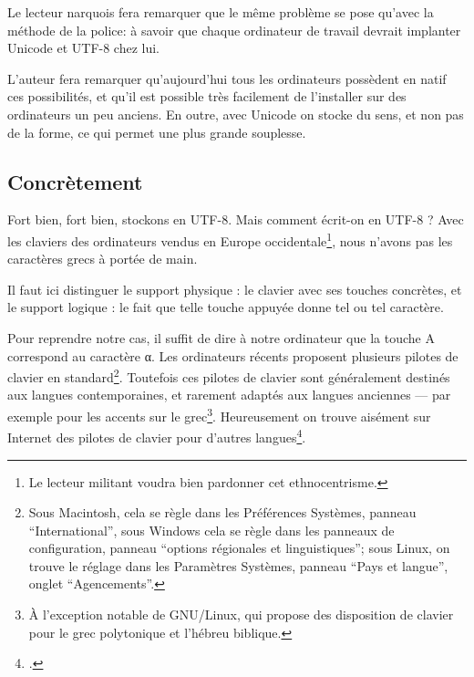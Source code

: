 \begin{plusloins}Le lecteur narquois fera remarquer que le même problème  se pose qu'avec la méthode de la police: à savoir que chaque ordinateur de travail devrait implanter Unicode et UTF-8 chez lui. 

L'auteur fera remarquer qu'aujourd'hui tous les ordinateurs possèdent en natif ces possibilités, et qu'il est possible très facilement de l'installer sur des ordinateurs un peu anciens. En outre, avec Unicode on stocke du sens, et non pas de la forme, ce qui permet une plus grande souplesse. 

\end{plusloins}

\subsection{Concrètement}

Fort bien, fort bien, stockons en UTF-8. Mais comment écrit-on en UTF-8 ? Avec les claviers des ordinateurs vendus en Europe occidentale\footnote{Le lecteur militant voudra bien pardonner cet ethnocentrisme.}, nous n'avons pas les caractères grecs à portée de main.

Il faut ici distinguer le support physique : le clavier avec ses touches concrètes, et le support logique : le fait que telle touche appuyée donne tel ou tel caractère. 

Pour reprendre notre cas, il suffit de dire à notre ordinateur que la touche A correspond au caractère α. Les ordinateurs récents proposent plusieurs pilotes de clavier en standard\footnote{Sous Macintosh, cela se règle dans les Préférences Systèmes, panneau \enquote{International}, sous Windows cela se règle dans les panneaux de configuration, panneau \enquote{options régionales et linguistiques}; sous Linux, on trouve le réglage dans les Paramètres Systèmes, panneau \enquote{Pays et langue}, onglet \enquote{Agencements}.}. Toutefois ces pilotes de clavier sont généralement destinés aux langues contemporaines, et rarement adaptés aux langues anciennes --- par exemple pour les accents sur le grec\footnote{À l'exception notable de GNU/Linux, qui propose des disposition de clavier pour le grec polytonique et l'hébreu biblique.}. Heureusement on trouve aisément sur Internet des pilotes de clavier pour d'autres langues\footcites[Pour ce qui concerne le grec ancien, le syriaque, l'hébreu ancien, on pourra utiliser les claviers proposés par Michael Langlois:][]{clavierLanglois}[ou encore, pour le grec, les pilotes de l'École Normale Supérieure][]{clavierENS}.



